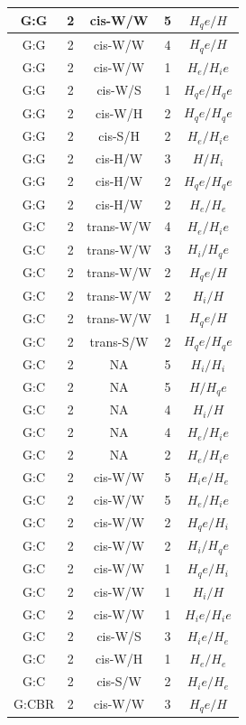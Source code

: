 \begin{center}
\begin{longtable}{c|c|c|c|c}
G:G & 2 & cis-W/W & 5 & $H_qe/H$ \\  \hline
G:G & 2 & cis-W/W & 4 & $H_qe/H$ \\  \hline
G:G & 2 & cis-W/W & 1 & $H_e/H_ie$ \\  \hline
G:G & 2 & cis-W/S & 1 & $H_qe/H_qe$ \\  \hline
G:G & 2 & cis-W/H & 2 & $H_qe/H_qe$ \\  \hline
G:G & 2 & cis-S/H & 2 & $H_e/H_ie$ \\  \hline
G:G & 2 & cis-H/W & 3 & $H/H_i$ \\  \hline
G:G & 2 & cis-H/W & 2 & $H_qe/H_qe$ \\  \hline
G:G & 2 & cis-H/W & 2 & $H_e/H_e$ \\  \hline
G:C & 2 & trans-W/W & 4 & $H_e/H_ie$ \\  \hline
G:C & 2 & trans-W/W & 3 & $H_i/H_qe$ \\  \hline
G:C & 2 & trans-W/W & 2 & $H_qe/H$ \\  \hline
G:C & 2 & trans-W/W & 2 & $H_i/H$ \\  \hline
G:C & 2 & trans-W/W & 1 & $H_qe/H$ \\  \hline
G:C & 2 & trans-S/W & 2 & $H_qe/H_qe$ \\  \hline
G:C & 2 & NA & 5 & $H_i/H_i$ \\  \hline
G:C & 2 & NA & 5 & $H/H_qe$ \\  \hline
G:C & 2 & NA & 4 & $H_i/H$ \\  \hline
G:C & 2 & NA & 4 & $H_e/H_ie$ \\  \hline
G:C & 2 & NA & 2 & $H_e/H_ie$ \\  \hline
G:C & 2 & cis-W/W & 5 & $H_ie/H_e$ \\  \hline
G:C & 2 & cis-W/W & 5 & $H_e/H_ie$ \\  \hline
G:C & 2 & cis-W/W & 2 & $H_qe/H_i$ \\  \hline
G:C & 2 & cis-W/W & 2 & $H_i/H_qe$ \\  \hline
G:C & 2 & cis-W/W & 1 & $H_qe/H_i$ \\  \hline
G:C & 2 & cis-W/W & 1 & $H_i/H$ \\  \hline
G:C & 2 & cis-W/W & 1 & $H_ie/H_ie$ \\  \hline
G:C & 2 & cis-W/S & 3 & $H_ie/H_e$ \\  \hline
G:C & 2 & cis-W/H & 1 & $H_e/H_e$ \\  \hline
G:C & 2 & cis-S/W & 2 & $H_ie/H_e$ \\  \hline
G:CBR & 2 & cis-W/W & 3 & $H_qe/H$ \\  \hline

\end{longtable}
\end{center}
